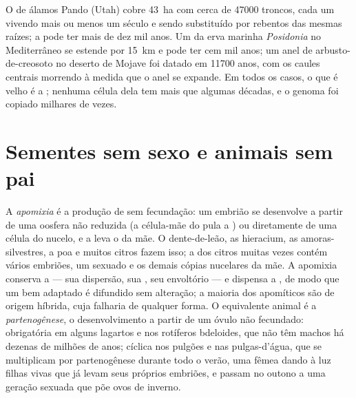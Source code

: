 \begin{example}\label{ex:b2:asexual-reproduction:oldest}
O  de álamos Pando (Utah) cobre \qty{43}{ha} com cerca de
\num{47000} troncos, cada um vivendo mais ou menos um século e sendo
substituído por rebentos das mesmas raízes; a  pode ter mais de
dez mil anos. Um  da erva marinha \emph{Posidonia} no
Mediterrâneo se estende por \qty{15}{km} e pode ter cem mil anos; um
anel de arbusto-de-creosoto no deserto de Mojave foi datado em
\num{11700} anos, com os caules centrais morrendo à medida que o anel
se expande. Em todos os casos, o que é velho é a ; nenhuma célula
dela tem mais que algumas décadas, e o genoma foi copiado milhares de
vezes.
\end{example}

\section{Sementes sem sexo e animais sem pai}

\begin{definition}[Apomixia]\label{def:b2:asexual-reproduction:apomixis}
A \emph{apomixia} é a produção de  sem fecundação: um embrião
se desenvolve a partir de uma oosfera não reduzida (a célula-mãe do
 pula a ) ou diretamente de uma célula do nucelo, e a
 leva o  da mãe. O dente-de-leão, as hieracium, as
amoras-silvestres, a poa e muitos citros fazem isso; a  dos
citros muitas vezes contém vários embriões, um sexuado e os demais
cópias nucelares da mãe. A apomixia conserva a  --- sua
dispersão, sua , seu envoltório --- e dispensa a , de
modo que um  bem adaptado é difundido sem alteração; a maioria
dos apomíticos são  de origem híbrida, cuja  falharia
de qualquer forma. O equivalente animal é a \emph{partenogênese}, o
desenvolvimento a partir de um óvulo não fecundado: obrigatória em
alguns lagartos e nos rotíferos bdeloides, que não têm machos há
dezenas de milhões de anos; cíclica nos pulgões e nas pulgas-d'água,
que se multiplicam por partenogênese durante todo o verão, uma fêmea
dando à luz filhas vivas que já levam seus próprios embriões, e passam
no outono a uma geração sexuada que põe ovos de inverno.
\end{definition}

